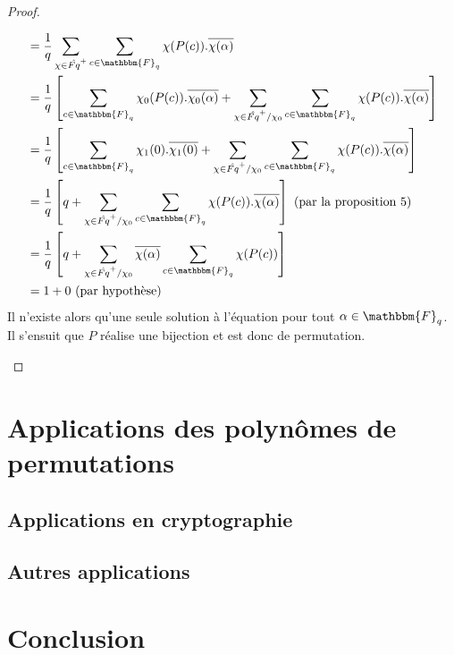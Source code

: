 \documentclass[12pt]{article}
\theoremstyle{remark}\newtheorem{note}{Note}
\theoremstyle{remark}\newtheorem{nota}{Notation}
\newcommand{\Fq}{\mathbbm{F}_q}
\theoremstyle{definition}
\begin{document}
\begin{proof}
\begin{enumerate}[label = \roman*)]
\begin{align*}
&= \displaystyle \frac{1}{q}\sum_{\chi \in \hat{Fq}^+}  \sum_{c\in\Fq}\chi(P(c)).\overline{\chi(\alpha)}\\
&= \displaystyle \frac{1}{q}\left[\sum_{c\in\Fq} \chi_0(P(c)).\overline{\chi_0(\alpha)}+\sum_{\chi \in \hat{Fq}^+/\chi_0} \sum_{c\in\Fq} \chi(P(c)).\overline{\chi(\alpha)}\right]\\
&= \displaystyle \frac{1}{q}\left[\sum_{c\in\Fq} \chi_1(0).\overline{\chi_1(0)}+\sum_{\chi \in \hat{Fq}^+/\chi_0} \sum_{c\in\Fq} \chi(P(c)).\overline{\chi(\alpha)}\right]\\
&= \displaystyle \frac{1}{q}\left[q+\sum_{\chi \in \hat{Fq}^+/\chi_0} \sum_{c\in\Fq} \chi(P(c)).\overline{\chi(\alpha)}\right]  \text{   (par la proposition 5)}\\
&= \displaystyle \frac{1}{q}\left[q+\sum_{\chi \in \hat{Fq}^+/\chi_0} \overline{\chi(\alpha)}\sum_{c\in\Fq} \chi(P(c))\right]\\
&= 1 + 0  \text{   (par hypothèse)}
\end{align*}
Il n'existe alors qu'une seule solution à l'équation pour tout $\alpha \in \Fq$. Il s'ensuit que $P$ réalise une bijection et est donc de permutation.


	\end{enumerate}
\end{proof}

\pagebreak

\section{Applications des polynômes de permutations}

\subsection{Applications en cryptographie}

\subsection{Autres applications}

\vfill \eject
\section*{Conclusion}
\end{document}
